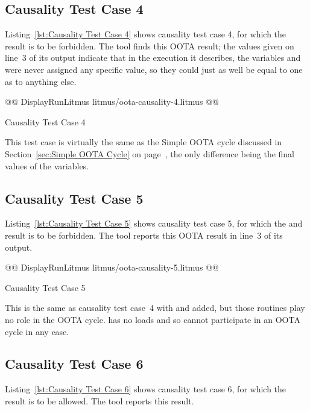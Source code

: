 \documentclass[10]{article}
\begin{document}
\subsection{Causality Test Case 4}
\label{app:Causality Test Case 4}

Listing~\ref{lst:Causality Test Case 4}
shows causality test case 4, for which the  result
is to be forbidden.
The  tool finds this OOTA result;
the  values given on line~3 of its output indicate
that in the execution it describes, the variables  and~ were never
assigned any specific value, so they could just as well be equal to
one as to anything else.

\begin{listing}[tbp]
@@ DisplayRunLitmus litmus/oota-causality-4.litmus @@
\caption{Causality Test Case 4}
\label{lst:Causality Test Case 4}
\end{listing}

This test case is virtually the same as the Simple OOTA cycle
discussed in
Section~\ref{sec:Simple OOTA Cycle}
on
page~\pageref{sec:Simple OOTA Cycle},
the only difference being the final values of the variables.

\subsection{Causality Test Case 5}
\label{app:Causality Test Case 5}

Listing~\ref{lst:Causality Test Case 5}
shows causality test case 5, for which the  and 
result is to be forbidden.
The  tool reports this OOTA result in line~3 of its output.

\begin{listing}[tbp]
@@ DisplayRunLitmus litmus/oota-causality-5.litmus @@
\caption{Causality Test Case 5}
\label{lst:Causality Test Case 5}
\end{listing}

This is the same as causality test case~4 with  and 
added, but those routines play no role in the OOTA cycle.
 has no loads and so cannot participate in an OOTA cycle in
any case.

\subsection{Causality Test Case 6}
\label{app:Causality Test Case 6}

Listing~\ref{lst:Causality Test Case 6}
shows causality test case 6, for which the 
result is to be allowed.
The  tool reports this result.
\end{document}
